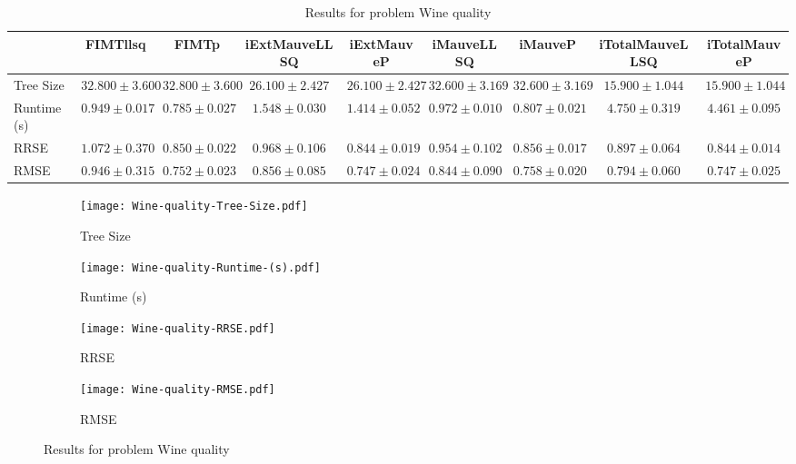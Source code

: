 \documentclass{article}
\begin{document}
\begin{table}[h]
\tiny
\begin{tabular}{|l|c|c|c|c|c|c|c|c|}
\hline
 & FIMTllsq & FIMTp & iExtMauveLLSQ & iExtMauveP & iMauveLLSQ & iMauveP & iTotalMauveLLSQ & iTotalMauveP\\
\hline
Tree Size & $32.800 \pm 3.600$ & $32.800 \pm 3.600$ & $26.100 \pm 2.427$ & $26.100 \pm 2.427$ & $32.600 \pm 3.169$ & $32.600 \pm 3.169$ & \cellcolor{blue!25} $15.900 \pm 1.044$ & \cellcolor{blue!25} $15.900 \pm 1.044$ \\
\hline
Runtime (s) & $0.949 \pm 0.017$ & \cellcolor{blue!25} $0.785 \pm 0.027$ & $1.548 \pm 0.030$ & $1.414 \pm 0.052$ & $0.972 \pm 0.010$ & $0.807 \pm 0.021$ & $4.750 \pm 0.319$ & $4.461 \pm 0.095$ \\
\hline
RRSE & $1.072 \pm 0.370$ & $0.850 \pm 0.022$ & $0.968 \pm 0.106$ & $0.844 \pm 0.019$ & $0.954 \pm 0.102$ & $0.856 \pm 0.017$ & $0.897 \pm 0.064$ & \cellcolor{blue!25} $0.844 \pm 0.014$ \\
\hline
RMSE & $0.946 \pm 0.315$ & $0.752 \pm 0.023$ & $0.856 \pm 0.085$ & $0.747 \pm 0.024$ & $0.844 \pm 0.090$ & $0.758 \pm 0.020$ & $0.794 \pm 0.060$ & \cellcolor{blue!25} $0.747 \pm 0.025$ \\
\hline
\end{tabular}
\caption{Results for problem Wine quality}
\end{table}
\begin{figure}[h]
\centering
\begin{subfigure}{0.45\textwidth}
  \texttt{[image: Wine-quality-Tree-Size.pdf]}
  \caption{Tree Size}
\end{subfigure}
\begin{subfigure}{0.45\textwidth}
  \texttt{[image: Wine-quality-Runtime-(s).pdf]}
  \caption{Runtime (s)}
\end{subfigure}
\begin{subfigure}{0.45\textwidth}
  \texttt{[image: Wine-quality-RRSE.pdf]}
  \caption{RRSE}
\end{subfigure}
\begin{subfigure}{0.45\textwidth}
  \texttt{[image: Wine-quality-RMSE.pdf]}
  \caption{RMSE}
\end{subfigure}
\caption{Results for problem Wine quality}
\end{figure}
\end{document}
